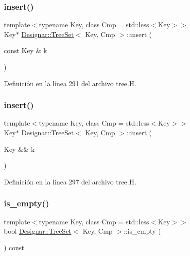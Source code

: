 \subsubsection{\texorpdfstring{insert()}{insert()}\hspace{0.1cm}{\footnotesize\ttfamily [1/2]}}
{\footnotesize\ttfamily template$<$typename Key, class Cmp = std\+::less$<$\+Key$>$$>$ \\
Key$\ast$ \hyperlink{class_designar_1_1_tree_set}{Designar\+::\+Tree\+Set}$<$ Key, Cmp $>$\+::insert (\begin{DoxyParamCaption}\item[{const Key \&}]{k }\end{DoxyParamCaption})\hspace{0.3cm}{\ttfamily [inline]}}



Definición en la línea 291 del archivo tree.\+H.

\mbox{\label{class_designar_1_1_tree_set_ae057018e4d2dd133eb7464f5fbe051de}} 
\subsubsection{\texorpdfstring{insert()}{insert()}\hspace{0.1cm}{\footnotesize\ttfamily [2/2]}}
{\footnotesize\ttfamily template$<$typename Key, class Cmp = std\+::less$<$\+Key$>$$>$ \\
Key$\ast$ \hyperlink{class_designar_1_1_tree_set}{Designar\+::\+Tree\+Set}$<$ Key, Cmp $>$\+::insert (\begin{DoxyParamCaption}\item[{Key \&\&}]{k }\end{DoxyParamCaption})\hspace{0.3cm}{\ttfamily [inline]}}



Definición en la línea 297 del archivo tree.\+H.

\mbox{\label{class_designar_1_1_tree_set_affe4342cb2019ced672a0dbf03a781b1}} 
\subsubsection{\texorpdfstring{is\+\_\+empty()}{is\_empty()}}
{\footnotesize\ttfamily template$<$typename Key, class Cmp = std\+::less$<$\+Key$>$$>$ \\
bool \hyperlink{class_designar_1_1_tree_set}{Designar\+::\+Tree\+Set}$<$ Key, Cmp $>$\+::is\+\_\+empty (\begin{DoxyParamCaption}{ }\end{DoxyParamCaption}) const\hspace{0.3cm}{\ttfamily [inline]}}



